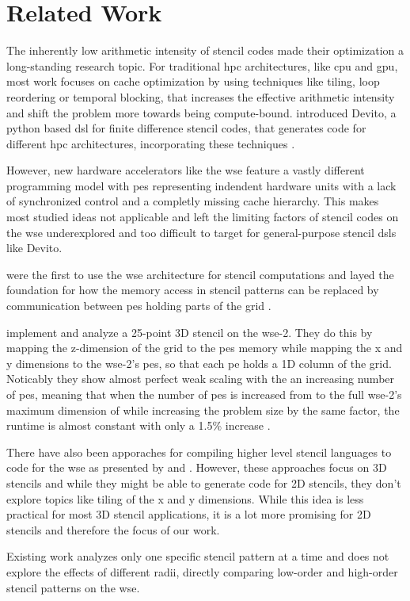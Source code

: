 \chapter{Related Work}
The inherently low arithmetic intensity of stencil codes made their optimization a long-standing research topic.
For traditional \ac{hpc} architectures, like \ac{cpu} and \ac{gpu}, most work focuses on cache optimization by using techniques like tiling, loop reordering or temporal blocking, that increases the effective arithmetic intensity and shift the problem more towards being compute-bound.
\textcite{lange2016devito} introduced Devito, a python based \ac{dsl} for finite difference stencil codes, that generates code for different \ac{hpc} architectures, incorporating these techniques \cite{lange2016devito}.

However, new hardware accelerators like the \ac{wse} feature a vastly different programming model with \acp{pe} representing indendent hardware units with a lack of synchronized control and a completly missing cache hierarchy. This makes most studied ideas not applicable and left the limiting factors of stencil codes on the \ac{wse} underexplored and too difficult to target for general-purpose stencil \ac{dsl}s like Devito.

\textcite{rocki2020fast} were the first to use the \ac{wse} architecture for stencil computations and layed the foundation for how the memory access in stencil patterns can be replaced by communication between \ac{pe}s holding parts of the grid \cite{rocki2020fast}.

\textcite{jacquelin2022massively} implement and analyze a 25-point 3D stencil on the \ac{wse}-2.
They do this by mapping the z-dimension of the grid to the \ac{pe}s memory while mapping the x and y dimensions to the \ac{wse}-2's \ac{pe}s, so that each \ac{pe} holds a 1D column of the grid.
Noticably they show almost perfect weak scaling with the an increasing number of \ac{pe}s, meaning that when the number of \ac{pe}s is increased from  to the full \ac{wse}-2's maximum dimension of  while increasing the problem size by the same factor, the runtime is almost constant with only a 1.5\% increase \cite{jacquelin2022massively}.

There have also been apporaches for compiling higher level stencil languages to code for the \ac{wse} as presented by \textcite{woo2022disruptive} and \textcite{sai2024automated} \cite{woo2022disruptive,sai2024automated}. However, these approaches focus on 3D stencils and while they might be able to generate code for 2D stencils, they don't explore topics like tiling of the x and y dimensions. While this idea is less practical for most 3D stencil applications, it is a lot more promising for 2D stencils and therefore the focus of our work.

Existing work analyzes only one specific stencil pattern at a time and does not explore the effects of different radii, directly comparing low-order and high-order stencil patterns on the \ac{wse}.